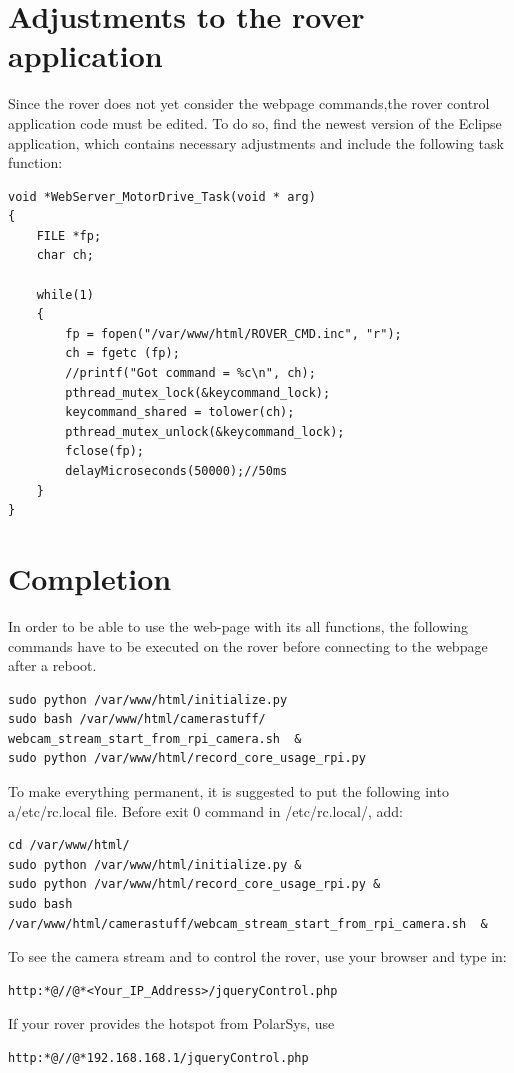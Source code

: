 \section{Adjustments to the rover application}
Since the rover does not yet consider the webpage commands,the rover control application code must be edited. To do so, find the newest version of the Eclipse application, which contains necessary adjustments and include the following task function:
\begin{lstlisting}
void *WebServer_MotorDrive_Task(void * arg)
{
	FILE *fp;
	char ch;

	while(1)
	{
		fp = fopen("/var/www/html/ROVER_CMD.inc", "r");
		ch = fgetc (fp);
		//printf("Got command = %c\n", ch);
		pthread_mutex_lock(&keycommand_lock);
		keycommand_shared = tolower(ch);
		pthread_mutex_unlock(&keycommand_lock);
		fclose(fp);
		delayMicroseconds(50000);//50ms
	}
}
\end{lstlisting}
\section{Completion}
In order to be able to use the web-page with its all functions, the following commands have to be executed on the rover before connecting to the webpage after a reboot.
\begin{lstlisting}
sudo python /var/www/html/initialize.py
sudo bash /var/www/html/camerastuff/ webcam_stream_start_from_rpi_camera.sh  &
sudo python /var/www/html/record_core_usage_rpi.py
\end{lstlisting}
To make everything permanent, it is suggested to put the following into a/etc/rc.local file. Before exit 0 command in /etc/rc.local/, add:
\begin{lstlisting}
cd /var/www/html/
sudo python /var/www/html/initialize.py &
sudo python /var/www/html/record_core_usage_rpi.py &
sudo bash /var/www/html/camerastuff/webcam_stream_start_from_rpi_camera.sh  &
\end{lstlisting}

To see the camera stream and to control the rover, use your browser and type in:
\begin{lstlisting}[label={lst:1}]
http:*@//@*<Your_IP_Address>/jqueryControl.php
\end{lstlisting}
If your rover provides the hotspot from PolarSys, use
\begin{lstlisting}[label={lst:partWrkflw}]
http:*@//@*192.168.168.1/jqueryControl.php
\end{lstlisting}
